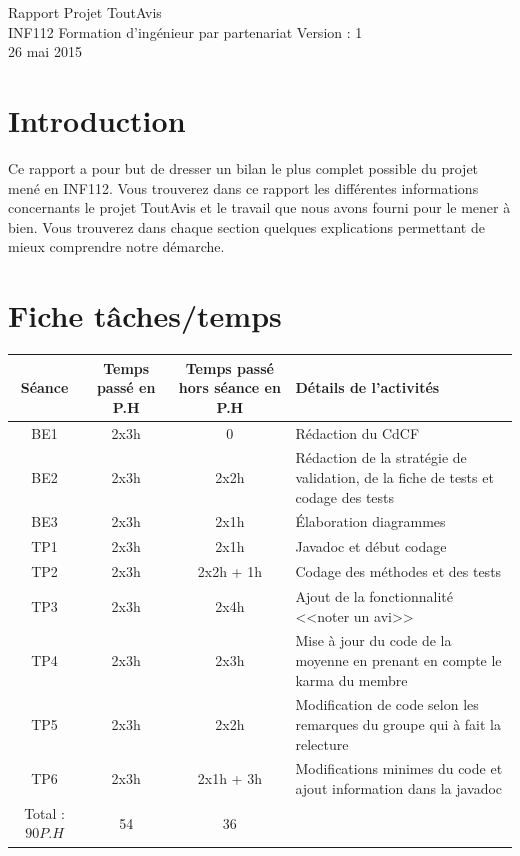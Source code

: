 \documentclass[12pt,a4paper]{report}
\begin{document}
  {Rapport Projet ToutAvis\\[10pt] INF112}
  {Formation d'ingénieur par partenariat
  \vspace{1cm}}
  {Version : 1\\ 
  \vspace{1cm}
  26 mai 2015}

\newpage
\tableofcontents
\newpage

\chapter*{Introduction}
\label{chapter:Introduction} %
\indent Ce rapport a pour but de dresser un bilan le plus complet possible du projet mené en INF112. Vous trouverez dans ce rapport les différentes informations concernants le projet ToutAvis et le travail que nous avons fourni pour le mener à bien. Vous trouverez dans chaque section quelques explications permettant de mieux comprendre notre démarche.

\chapter*{Fiche tâches/temps}
\label{chapter:Fiche tâches/temps} %

\begin{flushleft}
\begin{tabular}{|c|c|c|p{3cm}|} 
\hline 
Séance & Temps passé en P.H & Temps passé hors séance en P.H & Détails de l'activités \\ 
\hline 
BE1 & 2x3h & 0 & Rédaction du CdCF \\ 
\hline 
BE2 & 2x3h & 2x2h & Rédaction de la stratégie de validation, de la fiche de tests et codage des tests \\ 
\hline 
BE3 & 2x3h & 2x1h & Élaboration diagrammes \\ 
\hline 
TP1 & 2x3h & 2x1h & Javadoc et début codage \\ 
\hline 
TP2 & 2x3h & 2x2h + 1h & Codage des méthodes et des tests \\ 
\hline 
TP3 & 2x3h & 2x4h & Ajout de la fonctionnalité <<noter un avi>> \\ 
\hline 
TP4 & 2x3h & 2x3h & Mise à jour du code de la moyenne en prenant en compte le karma du membre  \\ 
\hline 
TP5 & 2x3h & 2x2h & Modification de code selon les remarques du groupe qui à fait la relecture \\
\hline 
TP6 & 2x3h & 2x1h + 3h & Modifications minimes du code et ajout information dans la javadoc\\
\hline
Total : $90 P.H$ & 54  & 36 &\\ 
\hline 
\end{tabular} 
\end{flushleft}
\end{document}
